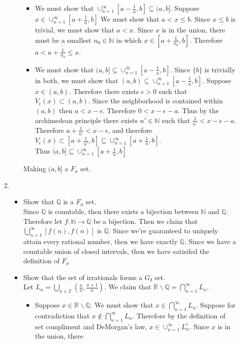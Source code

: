 \documentclass[12pt, letterpaper]{article}
\newcommand{\Z}{\mathbb{Z}}
\newcommand{\N}{\mathbb{N}}
\newcommand{\R}{\mathbb{R}}
\newcommand{\Q}{\mathbb{Q}}
\begin{document}
\begin{enumerate}
\begin{enumerate}
\begin{itemize}
			\begin{itemize}
				\item We must show that $\cup_{n=1}^\infty [a-\frac{1}{n}, b] \subseteq (a,b]$. Suppose $x \in \cup_{n=1}^\infty [a + \frac{1}{n}, b]$   We must show that $a < x \leq b$.  Since $x \leq b$ is trivial, we must show that $a < x$.
				Since $x$ is in the union, there must be a smallest $n_0 \in \N$ in which $x \in [a + \frac{1}{n_0}, b]$.  Therefore $a < a +  \frac{1}{n_0} \leq x$.  
				\item We must show that $(a,b] \subseteq  \cup_{n=1}^\infty [a-\frac{1}{n}, b]$.  Since $\{b\}$ is trivially in both, we must show that $(a,b) \subseteq  \cup_{n=1}^\infty [a-\frac{1}{n}, b]$.  Suppose $x \in (a,b)$.  Therefore there exists $\epsilon > 0$ such that $V_\epsilon(x) \subset (a,b)$.
				Since the neighborhood is contained within $(a,b)$ then 
				$a < x - \epsilon$.  Therefore $0 < x - \epsilon - a$.  Thus by the archimedean principle there exists $n' \in \N$ such that $\frac{1}{n'} < x - \epsilon - a$.  Therefore $a + \frac{1}{n'} < x - \epsilon$, and therefore $V_\epsilon(x) \subset [a+ \frac{1}{n'}, b] \subseteq \cup_{n=1}^\infty [a+ \frac{1}{n}, b]$. \\
				Thus $(a,b] \subseteq \cup_{n=1}^\infty [a+ \frac{1}{n}, b]$
			\end{itemize}
			Making $(a,b]$ a $F_\sigma$ set.     
		\end{itemize}
		\item 
		\begin{itemize}
			\item Show that $\Q$ is a $F_\sigma$ set.\\
			Since $\Q$ is countable, then there exists a bijection between $\N$ and $\Q$.  Therefore let $f: \N \to \Q$ be a bijection.  Then we claim that $\bigcup_{n=1}^\infty [f(n),f(n)]$ is $\Q$.  Since we're guaranteed to uniquely attain every rational number, then we have exactly $\Q$.  Since we have a countable union of closed intervals, then we have satisifed the definition of $F_\sigma$
			\item Show that the set of irrationals forms a $G_\delta$ set.\\
			Let $L_n = \displaystyle \bigcup_{x \in \Z} \left( \frac{x}{n},\frac{x+1}{n}\right)$.  We claim that $\R \backslash \Q = \displaystyle \bigcap_{n=1}^\infty L_n$.  
			\begin{itemize}
				\item Suppose $x \in \R \backslash \Q$.  We must show that $x \in \bigcap_{n=1}^\infty L_n$.  Suppose for contradiction that $x \not \in \bigcap_{n=1}^\infty L_n$.  Therefore by the definition of set compliment and  DeMorgan's law, $x \in \cup_{n=1}^\infty L_n^c$.  Since $x$ is in the union, there

\end{itemize}
\end{itemize}
\end{enumerate}
\end{enumerate}
\end{document}
